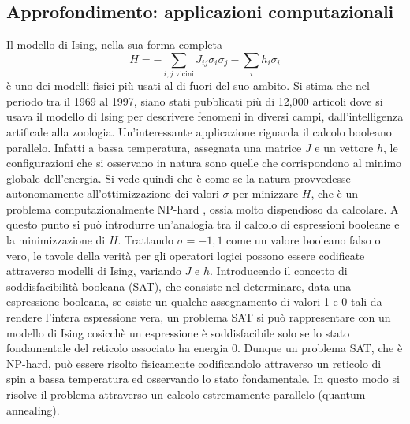 \documentclass[a4paper]{article}
\begin{document}
\subsection{Approfondimento: applicazioni computazionali}
Il modello di Ising, nella sua forma completa
\begin{equation}
H = - \sum_{i,j \text{ vicini}} J_{ij} \sigma_i \sigma_j - \sum_i h_i \sigma_i
\end{equation}
è uno dei modelli fisici più usati al di fuori del suo ambito. Si stima che nel periodo tra il 1969 al 1997, siano stati pubblicati più di 12,000 articoli dove si usava il modello di Ising per descrivere fenomeni in diversi campi, dall'intelligenza artificale alla zoologia. \cite{dwave}
Un'interessante applicazione riguarda il calcolo booleano parallelo. Infatti a bassa temperatura, assegnata una matrice $J$ e un vettore $h$, le configurazioni che si osservano in natura sono quelle che corrispondono al minimo globale dell'energia. Si vede quindi che è come se la natura provvedesse autonomamente all'ottimizzazione dei valori $\sigma$ per minizzare $H$, che è un problema computazionalmente NP-hard \cite{nphard}, ossia molto dispendioso da calcolare. A questo punto si può introdurre un'analogia tra il calcolo di espressioni booleane e la minimizzazione di $H$. Trattando $\sigma=-1, 1$ come un valore booleano falso o vero, le tavole della verità per gli operatori logici possono essere codificate attraverso modelli di Ising, variando $J$ e $h$. Introducendo il concetto di soddisfacibilità booleana (SAT), che consiste nel determinare, data una espressione booleana, se esiste un qualche assegnamento di valori 1 e 0 tali da rendere l'intera espressione vera, un problema SAT si può rappresentare con un modello di Ising cosicchè un espressione è soddisfacibile solo se lo stato fondamentale del reticolo associato ha energia 0. Dunque un problema SAT, che è NP-hard, può essere risolto fisicamente codificandolo attraverso un reticolo di spin a bassa temperatura ed osservando lo stato fondamentale. In questo modo si risolve il problema attraverso un calcolo estremamente parallelo (quantum annealing).\cite{quantumannealing}
\end{document}
